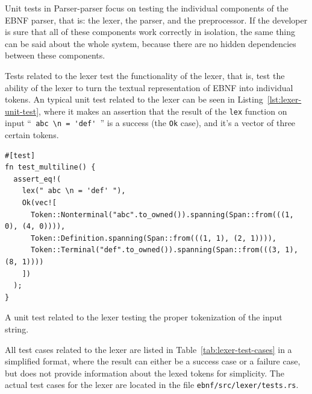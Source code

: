 \documentclass[english,bachelors,forcepolishlogotype]{wizthesis}
\newcommand{\thisproject}{Parser-parser}
\begin{document}
Unit tests in \thisproject{} focus on testing the individual components of the
EBNF parser, that is: the lexer, the parser, and the preprocessor. If the
developer is sure that all of these components work correctly in isolation, the
same thing can be said about the whole system, because there are no hidden
dependencies between these components.

Tests related to the lexer test the functionality of the lexer, that is, test
the ability of the lexer to turn the textual representation of EBNF into
individual tokens. An typical unit test related to the lexer can be seen in
Listing~\ref{lst:lexer-unit-test}, where it makes an assertion that the result
of the \texttt{lex} function on input ``\verb*| abc \n = 'def' |'' is a success
(the \texttt{Ok} case), and it's a vector of three certain tokens.

\begin{listing}[H]
  \begin{verbatim}
#[test]
fn test_multiline() {
  assert_eq!(
    lex(" abc \n = 'def' "),
    Ok(vec![
      Token::Nonterminal("abc".to_owned()).spanning(Span::from(((1, 0), (4, 0)))),
      Token::Definition.spanning(Span::from(((1, 1), (2, 1)))),
      Token::Terminal("def".to_owned()).spanning(Span::from(((3, 1), (8, 1))))
    ])
  );
}
  \end{verbatim}
  \caption{A unit test related to the lexer testing the proper tokenization of
  the input string.}
  \label{lst:lexer-unit-test}
\end{listing}

All test cases related to the lexer are listed in
Table~\ref{tab:lexer-test-cases} in a simplified format, where the result can
either be a success case or a failure case, but does not provide information
about the lexed tokens for simplicity. The actual test cases for the lexer
are located in the file \texttt{ebnf/src/lexer/tests.rs}.
\end{document}
